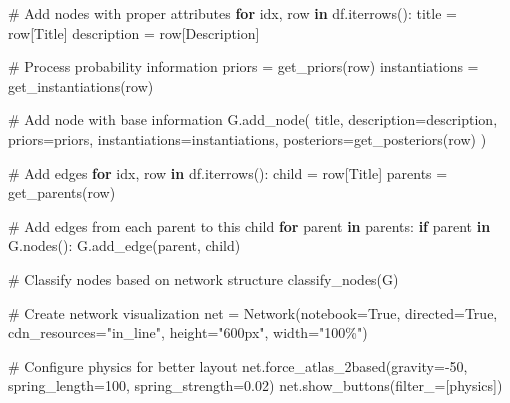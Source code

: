 \documentclass[
  11pt,
  letterpaper,
]{book}
\newenvironment{Shaded}{\begin{snugshade}}{\end{snugshade}}
\newcommand{\CommentTok}[1]{\textcolor[rgb]{0.37,0.37,0.37}{#1}}
\newcommand{\ControlFlowTok}[1]{\textcolor[rgb]{0.00,0.23,0.31}{\textbf{#1}}}
\newcommand{\DecValTok}[1]{\textcolor[rgb]{0.68,0.00,0.00}{#1}}
\newcommand{\FloatTok}[1]{\textcolor[rgb]{0.68,0.00,0.00}{#1}}
\newcommand{\KeywordTok}[1]{\textcolor[rgb]{0.00,0.23,0.31}{\textbf{#1}}}
\newcommand{\NormalTok}[1]{\textcolor[rgb]{0.00,0.23,0.31}{#1}}
\newcommand{\OperatorTok}[1]{\textcolor[rgb]{0.37,0.37,0.37}{#1}}
\newcommand{\StringTok}[1]{\textcolor[rgb]{0.13,0.47,0.30}{#1}}
\newcommand{\VariableTok}[1]{\textcolor[rgb]{0.07,0.07,0.07}{#1}}
\begin{document}
\begin{landscape}
\begin{Shaded}
\begin{Highlighting}[]
    \CommentTok{\# Add nodes with proper attributes}
    \ControlFlowTok{for}\NormalTok{ idx, row }\KeywordTok{in}\NormalTok{ df.iterrows():}
\NormalTok{        title }\OperatorTok{=}\NormalTok{ row[}\StringTok{\textquotesingle{}Title\textquotesingle{}}\NormalTok{]}
\NormalTok{        description }\OperatorTok{=}\NormalTok{ row[}\StringTok{\textquotesingle{}Description\textquotesingle{}}\NormalTok{]}

        \CommentTok{\# Process probability information}
\NormalTok{        priors }\OperatorTok{=}\NormalTok{ get\_priors(row)}
\NormalTok{        instantiations }\OperatorTok{=}\NormalTok{ get\_instantiations(row)}

        \CommentTok{\# Add node with base information}
\NormalTok{        G.add\_node(}
\NormalTok{            title,}
\NormalTok{            description}\OperatorTok{=}\NormalTok{description,}
\NormalTok{            priors}\OperatorTok{=}\NormalTok{priors,}
\NormalTok{            instantiations}\OperatorTok{=}\NormalTok{instantiations,}
\NormalTok{            posteriors}\OperatorTok{=}\NormalTok{get\_posteriors(row)}
\NormalTok{        )}

    \CommentTok{\# Add edges}
    \ControlFlowTok{for}\NormalTok{ idx, row }\KeywordTok{in}\NormalTok{ df.iterrows():}
\NormalTok{        child }\OperatorTok{=}\NormalTok{ row[}\StringTok{\textquotesingle{}Title\textquotesingle{}}\NormalTok{]}
\NormalTok{        parents }\OperatorTok{=}\NormalTok{ get\_parents(row)}

        \CommentTok{\# Add edges from each parent to this child}
        \ControlFlowTok{for}\NormalTok{ parent }\KeywordTok{in}\NormalTok{ parents:}
            \ControlFlowTok{if}\NormalTok{ parent }\KeywordTok{in}\NormalTok{ G.nodes():}
\NormalTok{                G.add\_edge(parent, child)}

    \CommentTok{\# Classify nodes based on network structure}
\NormalTok{    classify\_nodes(G)}

    \CommentTok{\# Create network visualization}
\NormalTok{    net }\OperatorTok{=}\NormalTok{ Network(notebook}\OperatorTok{=}\VariableTok{True}\NormalTok{, directed}\OperatorTok{=}\VariableTok{True}\NormalTok{, cdn\_resources}\OperatorTok{=}\StringTok{"in\_line"}\NormalTok{, height}\OperatorTok{=}\StringTok{"600px"}\NormalTok{, width}\OperatorTok{=}\StringTok{"100\%"}\NormalTok{)}

    \CommentTok{\# Configure physics for better layout}
\NormalTok{    net.force\_atlas\_2based(gravity}\OperatorTok{={-}}\DecValTok{50}\NormalTok{, spring\_length}\OperatorTok{=}\DecValTok{100}\NormalTok{, spring\_strength}\OperatorTok{=}\FloatTok{0.02}\NormalTok{)}
\NormalTok{    net.show\_buttons(filter\_}\OperatorTok{=}\NormalTok{[}\StringTok{\textquotesingle{}physics\textquotesingle{}}\NormalTok{])}


\end{Highlighting}
\end{Shaded}
\end{landscape}
\end{document}
